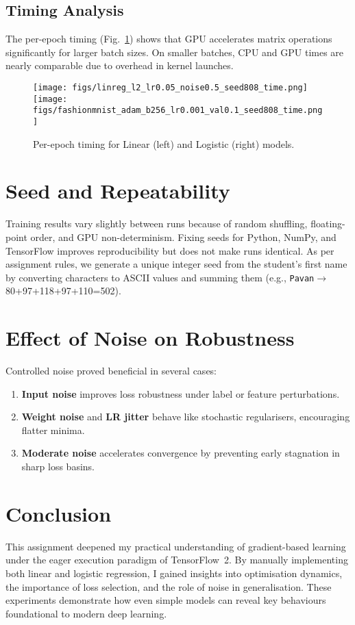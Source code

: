 \documentclass{article}
\begin{document}
\subsection{Timing Analysis}
The per-epoch timing (Fig.~\ref{fig:log-time}) shows that GPU accelerates matrix operations significantly for larger batch sizes. On smaller batches, CPU and GPU times are nearly comparable due to overhead in kernel launches.

\begin{figure}[t]
\centering
\texttt{[image: figs/linreg\_l2\_lr0.05\_noise0.5\_seed808\_time.png]}\hfill
\texttt{[image: figs/fashionmnist\_adam\_b256\_lr0.001\_val0.1\_seed808\_time.png]}
\caption{Per-epoch timing for Linear (left) and Logistic (right) models.}
\label{fig:lin-time}\label{fig:log-time}
\end{figure}

\section{Seed and Repeatability}
Training results vary slightly between runs because of random shuffling, floating-point order, and GPU non-determinism. Fixing seeds for Python, NumPy, and TensorFlow improves reproducibility but does not make runs identical. As per assignment rules, we generate a unique integer seed from the student’s first name by converting characters to ASCII values and summing them (e.g., \texttt{Pavan}$\to$80+97+118+97+110=502).

\section{Effect of Noise on Robustness}
Controlled noise proved beneficial in several cases:
\begin{enumerate}
    \item \textbf{Input noise} improves loss robustness under label or feature perturbations.
    \item \textbf{Weight noise} and \textbf{LR jitter} behave like stochastic regularisers, encouraging flatter minima.
    \item \textbf{Moderate noise} accelerates convergence by preventing early stagnation in sharp loss basins.
\end{enumerate}

\section{Conclusion}
This assignment deepened my practical understanding of gradient-based learning under the eager execution paradigm of TensorFlow~2. By manually implementing both linear and logistic regression, I gained insights into optimisation dynamics, the importance of loss selection, and the role of noise in generalisation. These experiments demonstrate how even simple models can reveal key behaviours foundational to modern deep learning.
\end{document}

